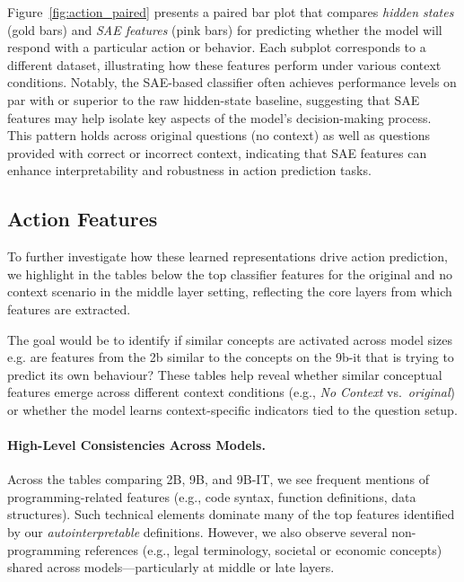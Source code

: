 Figure~\ref{fig:action_paired} presents a paired bar plot that compares \emph{hidden states} (gold bars) and \emph{SAE features} (pink bars) for predicting whether the model will respond with a particular action or behavior. Each subplot corresponds to a different dataset, illustrating how these features perform under various context conditions. Notably, the SAE-based classifier often achieves performance levels on par with or superior to the raw hidden-state baseline, suggesting that SAE features may help isolate key aspects of the model’s decision-making process. This pattern holds across original questions (no context) as well as questions provided with correct or incorrect context, indicating that SAE features can enhance interpretability and robustness in action prediction tasks.


\subsection{Action Features}
\label{app:action_autointerp}

To further investigate how these learned representations drive action prediction, we highlight in the tables below the top classifier features for the original and no context scenario in the middle layer setting, reflecting the core layers from which features are extracted. 

The goal would be to identify if similar concepts are activated across model sizes e.g. are features from the 2b similar to the concepts on the 9b-it that is trying to predict its own behaviour? These tables help reveal whether similar conceptual features emerge across different context conditions (e.g., \textit{No Context} vs.\ \textit{original}) or whether the model learns context-specific indicators tied to the question setup. 




\paragraph{High-Level Consistencies Across Models.}
Across the tables comparing 2B, 9B, and 9B-IT, we see frequent mentions of programming-related features (e.g., code syntax, function definitions, data structures). Such technical elements dominate many of the top features identified by our \textit{autointerpretable} definitions. However, we also observe several non-programming references (e.g., legal terminology, societal or economic concepts) shared across models—particularly at middle or late layers.

